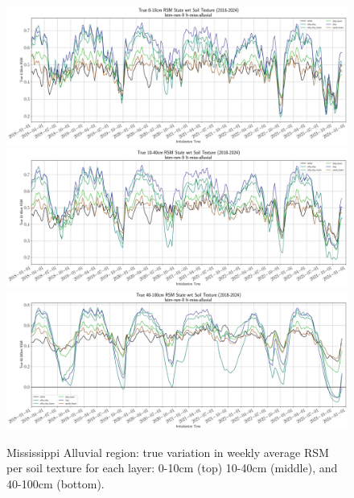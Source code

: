 \begin{figure}[hp!]
    \centering

    \includegraphics[width=.99\linewidth,draft=false]{figures/lt-miss-alluvial/eval-grid_lt-miss-alluvial_lstm-rsm-9_pixelwise-time-stats_txtr-true-state-rsm-10.png}
    \includegraphics[width=.99\linewidth,draft=false]{figures/lt-miss-alluvial/eval-grid_lt-miss-alluvial_lstm-rsm-9_pixelwise-time-stats_txtr-true-state-rsm-40.png}
    \includegraphics[width=.99\linewidth,draft=false]{figures/lt-miss-alluvial/eval-grid_lt-miss-alluvial_lstm-rsm-9_pixelwise-time-stats_txtr-true-state-rsm-100.png}

    \caption{Mississippi Alluvial region: true variation in weekly average RSM per soil texture for each layer: 0-10cm (top) 10-40cm (middle), and 40-100cm (bottom).}
    \label{lt_true-rsm_miss-alluvial}
\end{figure}


